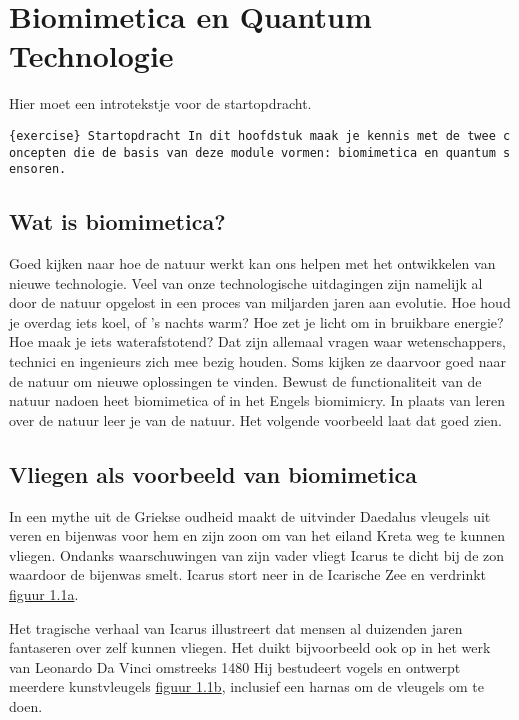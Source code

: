 \hypertarget{biomimetica-en-quantum-technologie}{%
\section{Biomimetica en Quantum
Technologie}\label{biomimetica-en-quantum-technologie}}

Hier moet een introtekstje voor de startopdracht.

\texttt{\{exercise\}\ Startopdracht\ In\ dit\ hoofdstuk\ maak\ je\ kennis\ met\ de\ twee\ concepten\ die\ de\ basis\ van\ deze\ module\ vormen:\ biomimetica\ en\ quantum\ sensoren.}

\hypertarget{wat-is-biomimetica}{%
\subsection{Wat is biomimetica?}\label{wat-is-biomimetica}}

Goed kijken naar hoe de natuur werkt kan ons helpen met het ontwikkelen
van nieuwe technologie. Veel van onze technologische uitdagingen zijn
namelijk al door de natuur opgelost in een proces van miljarden jaren
aan evolutie. Hoe houd je overdag iets koel, of 's nachts warm? Hoe zet
je licht om in bruikbare energie? Hoe maak je iets waterafstotend? Dat
zijn allemaal vragen waar wetenschappers, technici en ingenieurs zich
mee bezig houden. Soms kijken ze daarvoor goed naar de natuur om nieuwe
oplossingen te vinden. Bewust de functionaliteit van de natuur nadoen
heet biomimetica of in het Engels biomimicry. In plaats van leren over
de natuur leer je van de natuur. Het volgende voorbeeld laat dat goed
zien.

\hypertarget{vliegen-als-voorbeeld-van-biomimetica}{%
\subsection{Vliegen als voorbeeld van
biomimetica}\label{vliegen-als-voorbeeld-van-biomimetica}}

In een mythe uit de Griekse oudheid maakt de uitvinder Daedalus vleugels
uit veren en bijenwas voor hem en zijn zoon om van het eiland Kreta weg
te kunnen vliegen. Ondanks waarschuwingen van zijn vader vliegt Icarus
te dicht bij de zon waardoor de bijenwas smelt. Icarus stort neer in de
Icarische Zee en verdrinkt \href{fig1.1}{figuur 1.1a}.

Het tragische verhaal van Icarus illustreert dat mensen al duizenden
jaren fantaseren over zelf kunnen vliegen. Het duikt bijvoorbeeld ook op
in het werk van Leonardo Da Vinci omstreeks 1480 Hij bestudeert vogels
en ontwerpt meerdere kunstvleugels \href{fig1.1}{figuur 1.1b}, inclusief
een harnas om de vleugels om te doen.

